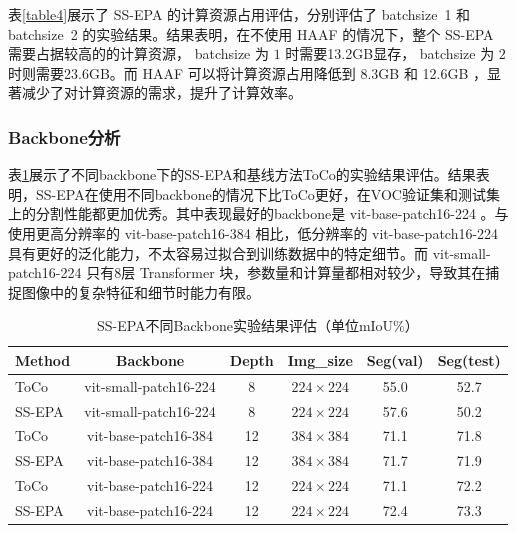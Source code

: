 表\ref{table4}展示了 SS-EPA 的计算资源占用评估，分别评估了 batchsize~1 和 batchsize~2 的实验结果。结果表明，在不使用 HAAF 的情况下，整个 SS-EPA 需要占据较高的的计算资源， batchsize 为 $1$ 时需要13.2GB显存， batchsize 为 $2$ 时则需要23.6GB。而 HAAF 可以将计算资源占用降低到 8.3GB 和 12.6GB ，显著减少了对计算资源的需求，提升了计算效率。

\begin{CJK*}{UTF8}{zhhei}
    \subsubsection{Backbone分析}
\end{CJK*}


表\ref{table5}展示了不同backbone下的SS-EPA和基线方法ToCo的实验结果评估。结果表明，SS-EPA在使用不同backbone的情况下比ToCo更好，在VOC验证集和测试集上的分割性能都更加优秀。其中表现最好的backbone是 vit-base-patch16-224 。与使用更高分辨率的 vit-base-patch16-384 相比，低分辨率的 vit-base-patch16-224 具有更好的泛化能力，不太容易过拟合到训练数据中的特定细节。而 vit-small-patch16-224 只有$8$层 Transformer 块，参数量和计算量都相对较少，导致其在捕捉图像中的复杂特征和细节时能力有限。

\begin{table}[!htbp]
    \small
    \setlength{\tabcolsep}{6mm}
    \centering
    \caption{ SS-EPA不同Backbone实验结果评估（单位mIoU\%）}\label{table5}
    \begin{tabular}{lccccc}
        \toprule
        Method & Backbone & Depth & Img\_size & Seg(val) & Seg(test) \\
        \midrule
        ToCo & vit-small-patch16-224 & 8 & $224\times 224$ & 55.0 & 52.7 \\
        SS-EPA & vit-small-patch16-224 & 8 & $224\times 224$ & 57.6 & 50.2 \\
        ToCo & vit-base-patch16-384 & 12 & $384\times 384$ & 71.1 & 71.8 \\
        SS-EPA & vit-base-patch16-384 & 12 & $384\times 384$ & 71.7 & 71.9 \\
        ToCo & vit-base-patch16-224 & 12 & $224\times 224$ & 71.1 & 72.2 \\
        SS-EPA & vit-base-patch16-224 & 12 & $224\times 224$ & 72.4 & 73.3 \\    
        \bottomrule
    \end{tabular}
\end{table}